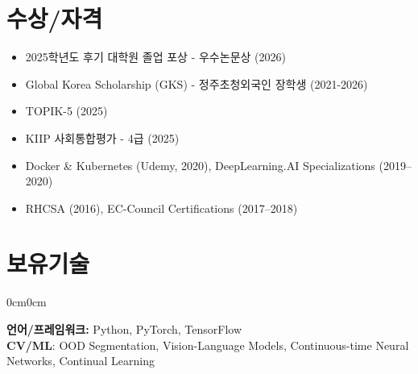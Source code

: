\documentclass[10pt, letterpaper]{article}
\newenvironment{onecolentry}{
	\begin{adjustwidth}{0cm}{0cm}
	}{
	\end{adjustwidth}
}
\newenvironment{highlights}{
	\begin{itemize}[
		topsep=0.10cm,
		parsep=0.05cm,
		partopsep=0pt,
		itemsep=0pt,
		leftmargin=14pt
		]
	}{
	\end{itemize}
}
\begin{document}
	\section{수상/자격}
	\begin{highlights}
		\item 2025학년도 후기 대학원 졸업 포상 - 우수논문상 (2026)
		\item Global Korea Scholarship (GKS) - 정주초청외국인 장학생 (2021-2026)
		\item TOPIK-5 (2025)
		\item KIIP 사회통합평가 - 4급 (2025)
		\item Docker \& Kubernetes (Udemy, 2020), DeepLearning.AI Specializations (2019--2020)
		\item RHCSA (2016), EC-Council Certifications (2017--2018)
	\end{highlights}
	
	\section{보유기술}
	\begin{onecolentry}
		\textbf{언어/프레임워크:} Python, PyTorch, TensorFlow \\
		\textbf{CV/ML}: OOD Segmentation, Vision-Language Models, Continuous-time Neural Networks, Continual Learning \\
	\end{onecolentry}
	
	
	
\end{document}
